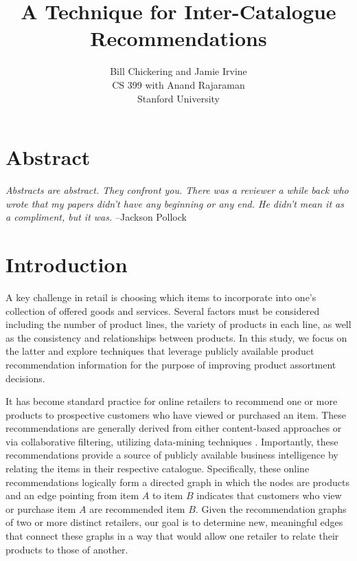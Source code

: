 \documentclass[11pt]{article}
\begin{document}

\title{A Technique for Inter-Catalogue Recommendations}
\author{Bill Chickering and Jamie Irvine\\
CS 399 with Anand Rajaraman\\
Stanford University}
\renewcommand{\today}{June 11, 2014}
\maketitle

\section*{Abstract}
\emph{Abstracts are abstract. They confront you. There was a reviewer a
while back who wrote that my papers didn't have any beginning or any end. He
didn't mean it as a compliment, but it was.} --Jackson Pollock

\section*{Introduction}
A key challenge in retail is choosing which items to incorporate into one's
collection of offered goods and services.  Several factors must be considered
including the number of product lines, the variety of products in each line, as
well as the consistency and relationships between products. In this study, we
focus on the latter and explore techniques that leverage publicly available
product recommendation information for the purpose of improving product
assortment decisions.

It has become standard practice for online retailers to recommend one or more
products to prospective customers who have viewed or purchased an item. These
recommendations are generally derived from either content-based approaches or
via collaborative filtering, utilizing data-mining techniques \cite{Ricci2011}.
Importantly, these recommendations provide a source of publicly available
business intelligence by relating the items in their respective catalogue.
Specifically, these online recommendations logically form a directed graph in
which the nodes are products and an edge pointing from item $A$ to item $B$
indicates that customers who view or purchase item $A$ are recommended item $B$.
Given the recommendation graphs of two or more distinct retailers, our goal is
to determine new, meaningful edges that connect these graphs in a way that would
allow one retailer to relate their products to those of another.
\end{document}
